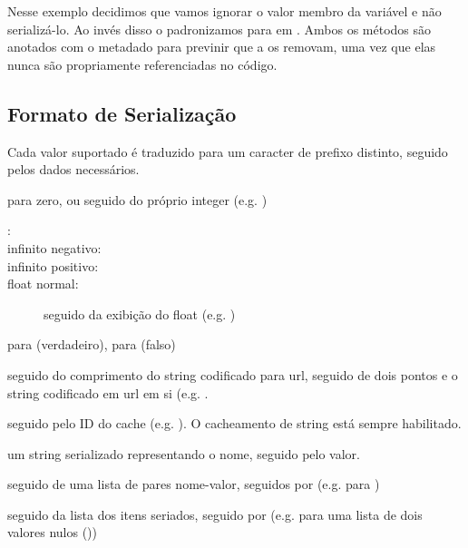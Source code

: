 {\begin{description}
Nesse exemplo decidimos que vamos ignorar o valor membro da variável  e não serializá-lo. Ao invés disso o padronizamos para  em . Ambos os métodos são anotados com o metadado  para previnir que a  os removam, uma vez que elas nunca são propriamente referenciadas no código.

\subsection{Formato de Serialização}
\label{std-serialization-format}

Cada valor suportado é traduzido para um caracter de prefixo distinto, seguido pelos dados necessários.

	\item[\expr{null}:] 
	\item[\type{Int}:]  para zero, ou  seguido do próprio integer (e.g. )
    \item[\type{Float}:]
		\begin{description}
			\item[:] 
			\item[infinito negativo:] 
			\item[infinito positivo:] 
			\item[float normal:]  seguido da exibição do float (e.g. )
		\end{description}
    \item[\type{Bool}:]  para (verdadeiro),  para (falso)
    \item[\type{String}:]  seguido do comprimento do string codificado para url, seguido de dois pontos e o string codificado em url em si (e.g. .
	\item[\type{String}(cacheado):]  seguido pelo ID do cache (e.g. ). O cacheamento de string está sempre habilitado.
    \item[Pares nome-valor:]um string serializado representando o nome, seguido pelo valor.
    \item[estrutura:]  seguido de uma lista de pares nome-valor, seguidos por  (e.g.  para )
    \item[\type{List}:]  seguido da lista dos itens seriados, seguido por  (e.g.  para uma lista de dois valores nulos ())

\end{description}}
